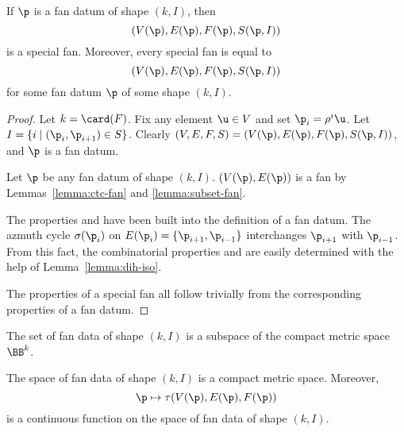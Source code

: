 \begin{lemma}[]
If $\p$ is a fan datum of shape $(k,I)$, then
\begin{displaymath}
(V(\p),E(\p),F(\p),S(\p,I))
\end{displaymath}
is a special fan.  Moreover, every special fan is equal to
\begin{displaymath}
(V(\p),E(\p),F(\p),S(\p,I))
\end{displaymath}
for some fan datum $\p$ of some shape $(k,I)$.
\end{lemma}

\begin{proof}
  Let $k=\card(F)$.  Fix any element $\u\in V$ and
set $\p_i = \rho^i \u$.  Let $I = \{i\mid (\p_i,\p_{i+1}) \in S\}$.
Clearly $(V,E,F,S)=(V(\p),E(\p),F(\p),S(\p,I))$, and $\p$ is a fan
datum.

Let $\p$ be any fan datum of shape $(k,I)$.
$(V(\p),E(\p))$
is a fan by Lemmas~\ref{lemma:ctc-fan} and \ref{lemma:subset-fan}.


 The properties
 and  have been built into the definition of a
fan datum.  The azmuth cycle $\sigma(\p_i)$ on $E(\p_i) =
\{\p_{i+1},\p_{i-1}\}$ interchanges $\p_{i+1}$ with $\p_{i-1}$.  From
this fact, the combinatorial properties  and  are easily determined with
the help of Lemma~\ref{lemma:dih-iso}.  

 The properties
of a special fan all follow trivially from the corresponding
properties of a fan datum.
\end{proof}

The set of fan data of shape $(k,I)$ is a subspace of the compact metric
space $\BB^k$.


\begin{lemma}[]
The space of fan data of shape $(k,I)$ is a compact metric space.
Moreover,
\begin{displaymath}
\p \mapsto \tau(V(\p),E(\p),F(\p))
\end{displaymath}
is a continuous function on the space of fan data of shape $(k,I)$.
\end{lemma}

